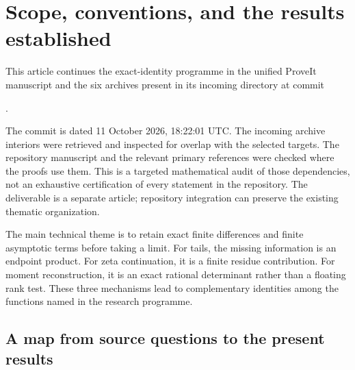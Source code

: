 \section{Scope, conventions, and the results established}
\label{intro:section}

This article continues the exact-identity programme in the unified
ProveIt manuscript and the six archives present in its incoming
directory at commit
\begin{center}\sourcepin.\end{center}
The commit is dated 11 October 2026, 18:22:01 UTC. The incoming archive
interiors were retrieved and inspected for overlap with the selected
targets. The repository manuscript and the relevant primary references
were checked where the proofs use them. This is a targeted mathematical
audit of those dependencies, not an exhaustive certification of every
statement in the repository. The deliverable is a separate article;
repository integration can preserve the existing thematic organization.

The main technical theme is to retain exact finite differences and
finite asymptotic terms before taking a limit. For tails, the missing
information is an endpoint product. For zeta continuation, it is a
finite residue contribution. For moment reconstruction, it is an exact
rational determinant rather than a floating rank test. These three
mechanisms lead to complementary identities among the functions named
in the research programme.

\subsection{A map from source questions to the present results}

